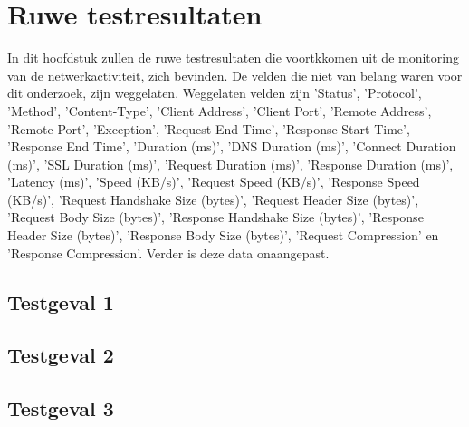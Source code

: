\chapter{Ruwe testresultaten}
\label{appendix:rawresults}

In dit hoofdstuk zullen de ruwe testresultaten die voortkkomen uit de monitoring van de netwerkactiviteit, zich bevinden. De velden die niet van belang waren voor dit onderzoek, zijn weggelaten. Weggelaten velden zijn 'Status', 'Protocol', 'Method', 'Content-Type', 'Client Address', 'Client Port', 'Remote Address', 'Remote Port', 'Exception', 'Request End Time', 'Response Start Time', 'Response End Time', 'Duration (ms)', 'DNS Duration (ms)', 'Connect Duration (ms)', 'SSL Duration (ms)', 'Request Duration (ms)', 'Response Duration (ms)', 'Latency (ms)', 'Speed (KB/s)', 'Request Speed (KB/s)', 'Response Speed (KB/s)', 'Request Handshake Size (bytes)', 'Request Header Size (bytes)', 'Request Body Size (bytes)', 'Response Handshake Size (bytes)', 'Response Header Size (bytes)', 'Response Body Size (bytes)', 'Request Compression' en 'Response Compression'. Verder is deze data onaangepast.

\section{Testgeval 1}



\section{Testgeval 2}



\section{Testgeval 3}

